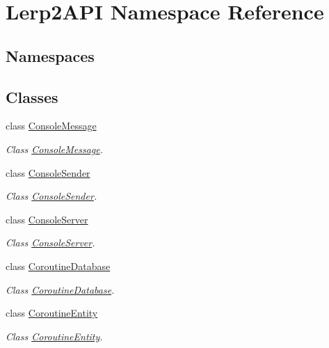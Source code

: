 \hypertarget{namespace_lerp2_a_p_i}{}\section{Lerp2\+A\+PI Namespace Reference}
\label{namespace_lerp2_a_p_i}
\subsection*{Namespaces}
\begin{DoxyCompactItemize}
\end{DoxyCompactItemize}
\subsection*{Classes}
\begin{DoxyCompactItemize}
\item 
class \hyperlink{class_lerp2_a_p_i_1_1_console_message}{Console\+Message}
\begin{DoxyCompactList}\small\item\em Class \hyperlink{class_lerp2_a_p_i_1_1_console_message}{Console\+Message}. \end{DoxyCompactList}\item 
class \hyperlink{class_lerp2_a_p_i_1_1_console_sender}{Console\+Sender}
\begin{DoxyCompactList}\small\item\em Class \hyperlink{class_lerp2_a_p_i_1_1_console_sender}{Console\+Sender}. \end{DoxyCompactList}\item 
class \hyperlink{class_lerp2_a_p_i_1_1_console_server}{Console\+Server}
\begin{DoxyCompactList}\small\item\em Class \hyperlink{class_lerp2_a_p_i_1_1_console_server}{Console\+Server}. \end{DoxyCompactList}\item 
class \hyperlink{class_lerp2_a_p_i_1_1_coroutine_database}{Coroutine\+Database}
\begin{DoxyCompactList}\small\item\em Class \hyperlink{class_lerp2_a_p_i_1_1_coroutine_database}{Coroutine\+Database}. \end{DoxyCompactList}\item 
class \hyperlink{class_lerp2_a_p_i_1_1_coroutine_entity}{Coroutine\+Entity}
\begin{DoxyCompactList}\small\item\em Class \hyperlink{class_lerp2_a_p_i_1_1_coroutine_entity}{Coroutine\+Entity}. \end{DoxyCompactList}\item 

\end{DoxyCompactItemize}
